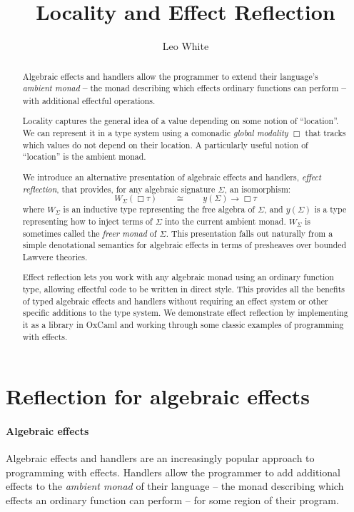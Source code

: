 \documentclass[acmsmall, screen, nonacm]{acmart}
\title{Locality and Effect Reflection}
\author{Leo White}
\affiliation{\institution{Jane Street}\country{UK}}
\date{}
\theoremstyle{definition}
\newcommand{\glob}{\mathop{\Box}}
\newcommand{\yoneda}[1]{y(#1)}
\newcommand{\ind}[1]{W_{#1}}
\begin{document}
\begin{abstract}
  Algebraic effects and handlers allow the programmer to extend their
  language's \emph{ambient monad} \textbf{--} the monad describing which
  effects ordinary functions can perform \textbf{--} with additional
  effectful operations.

  Locality captures the general idea of a value depending on some notion
  of ``location''. We can represent it in a type system using a
  comonadic \emph{global modality} $\glob$ that tracks which values do
  not depend on their location. A particularly useful notion of
  ``location'' is the ambient monad.

  We introduce an alternative presentation of algebraic effects and
  handlers, \emph{effect reflection}, that provides, for any algebraic
  signature $\Sigma$, an isomorphism:
  \begin{equation*}
    \ind{\Sigma}(\glob \tau) \qquad \cong \qquad \yoneda{\Sigma} \rightarrow \glob \tau
  \end{equation*}
  where $\ind{\Sigma}$ is an inductive type representing the free
  algebra of $\Sigma$, and $\yoneda{\Sigma}$ is a type representing how
  to inject terms of $\Sigma$ into the current ambient
  monad. $\ind{\Sigma}$ is sometimes called the \emph{freer monad} of
  $\Sigma$. This presentation falls out naturally from a simple
  denotational semantics for algebraic effects in terms of presheaves
  over bounded Lawvere theories.

  Effect reflection lets you work with any algebraic monad using an
  ordinary function type, allowing effectful code to be written in
  direct style. This provides all the benefits of typed algebraic
  effects and handlers without requiring an effect system or other
  specific additions to the type system. We demonstrate effect
  reflection by implementing it as a library in
  OxCaml\cite{lorenzen2024oxidizing} and working through some classic
  examples of programming with effects.
\end{abstract}

\maketitle

\section{Reflection for algebraic effects}

\paragraph{Algebraic effects} Algebraic effects and handlers are an
increasingly popular approach to programming with effects. Handlers
allow the programmer to add additional effects to the \emph{ambient
  monad} of their language -- the monad describing which effects an
ordinary function can perform -- for some region of their program.
\end{document}
